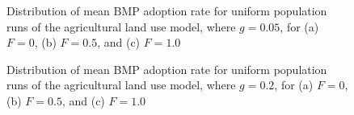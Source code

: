 \begin{figure}[p]
    \hfill
    \hfill
    \caption{Distribution of mean BMP adoption rate for uniform population
        runs of the agricultural land use model, where $g=0.05$,
        for (a) $F=0$, (b) $F=0.5$, and (c) $F=1.0$}
    \label{fig:farm_res_g05}
\end{figure}

\begin{figure}[p]
    \hfill
    \hfill
    \caption{Distribution of mean BMP adoption rate for uniform population
        runs of the agricultural land use model, where $g=0.2$,
        for (a) $F=0$, (b) $F=0.5$, and (c) $F=1.0$}
    \label{fig:farm_res_g20}
\end{figure}

